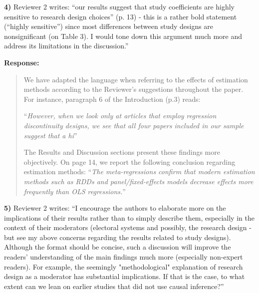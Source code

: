 \documentclass[a4paper,12pt]{article}
\begin{document}
\vspace{.3cm}

\noindent \textbf{4)} Reviewer 2 writes: ``our results suggest that study coefficients are highly sensitive to research design choices'' (p. 13) - this is a rather bold statement (``highly sensitive'') since most differences between study designs are nonsignificant (on Table 3). I would tone down this argument much more and address its limitations in the discussion.'' 

\vspace{.3cm}

\noindent \textbf{Response:} 
\begin{quote}
    We have adapted the language when referring to the effects of estimation methods according to the Reviewer's suggestions throughout the paper. For instance, paragraph 6 of the Introduction (p.3) reads:
    
    ``\textit{However, when we look only at articles that employ regression discontinuity designs, we see that all four papers included in our sample suggest that a hi}''
    
    The Results and Discussion sections present these findings more objectively. On page 14, we report the following conclusion regarding estimation methods: ``\textit{The meta-regressions confirm that modern estimation methods such as RDDs and panel/fixed-effects models decrease effects more frequently than OLS regressions.}''
\end{quote}

\vspace{.3cm}

\noindent \textbf{5)} Reviewer 2 writes: ``I encourage the authors to elaborate more on the implications of their results rather than to simply describe them, especially in the context of their moderators (electoral systems and possibly, the research design - but see my above concerns regarding the results related to study designs). Although the format should be concise, such a discussion will improve the readers' understanding of the main findings much more (especially non-expert readers). For example, the seemingly "methodological" explanation of research design as a moderator has substantial implications. If that is the case, to what extent can we lean on earlier studies that did not use causal inference?''

\vspace{.3cm}
\end{document}
